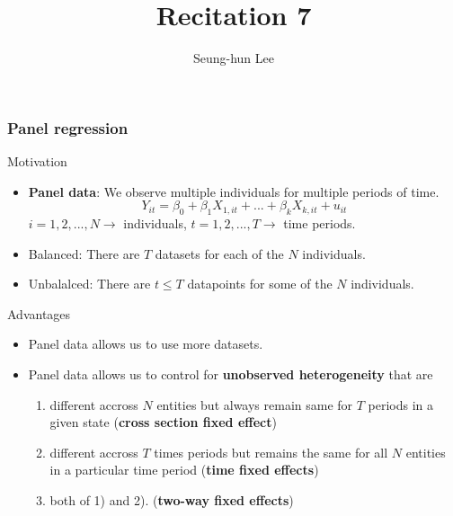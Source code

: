 \documentclass[compress]{beamer}
\title[Recitation 7]{Recitation 7} %
\author[Seung-hun Lee]{Seung-hun Lee}
\institute[Columbia University]{Columbia University}
\date[]{}
\begin{document}
\begin{frame}
\titlepage
\end{frame}



\begin{frame}
\frametitle{Panel regression}
Motivation
\begin{itemize}
\item \textbf{Panel data}: We observe multiple individuals for multiple periods of time.
\[
Y_{it} = \beta_0 + \beta_1X_{1,it}+ ... +\beta_kX_{k,it}+u_{it}
\]
$i=1,2,...,N \to$  individuals, $t=1,2,...,T\to$  time periods.
\item Balanced: There are $T$ datasets for each of the $N$ individuals.
\item Unbalalced: There are $t\leq T$ datapoints for some of the $N$ individuals.
\end{itemize}

Advantages
\begin{itemize}
\item Panel data allows us to use more datasets. 
\item Panel data allows us to control for \textbf{unobserved heterogeneity} that are
\begin{enumerate}
\item  different accross $N$ entities but always remain same for $T$ periods in a given state (\textbf{cross section fixed effect})
\item different accross $T$ times periods but remains the same for all $N$ entities in a particular time period  (\textbf{time fixed effects})
\item both of 1) and 2). (\textbf{two-way fixed effects})
\end{enumerate}
\end{itemize}
\end{frame}
\end{document}
